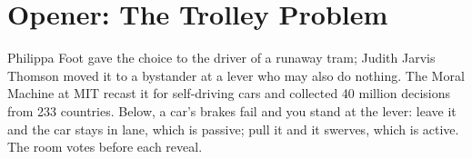 \newpage
\section*{Opener: The Trolley Problem}

 Philippa Foot gave the choice to the
driver of a runaway tram\cite{foot1967abortion}; Judith Jarvis Thomson
moved it to a bystander at a lever who may also do
nothing\cite{thomson1985trolley}. The Moral Machine
at MIT recast it for self-driving cars and collected 40 million decisions
from 233 countries\cite{awad2018moral}. Below, a car's brakes fail and you
stand at the lever: leave it and the car stays in lane, which is passive;
pull it and it swerves, which is active. The room votes before each reveal.

\newcommand{\mmdead}[2]{\foreach \x in {#2} \fill[mmdead] (\x,#1) circle (0.06);}
\newcommand{\mmalive}[2]{\foreach \x in {#2}
  \draw[mmalive, line width=0.5pt] (\x,#1) circle (0.055);}
\newcommand{\mmpanel}[3][false]{%
  \begin{tikzpicture}
    \path (0,-0.4) rectangle (4.95,1.45);
    \draw[black!20, line width=0.4pt] (0,0) -- (4.4,0) (0,1.2) -- (4.4,1.2);
    \draw[black!20, line width=0.4pt, dash pattern=on 3pt off 3pt]
      (0,0.6) -- (4.4,0.6);
    #3
    \fill[black!15, rounded corners=0.13cm] (0.15,0.77) rectangle (0.85,1.03);
    \ifthenelse{\equal{#1}{true}}{\mmdead{0.9}{0.62}}{\mmalive{0.9}{0.62}}
    \ifthenelse{\equal{#2}{pull}}
      {\draw[black!60, line width=0.5pt, -{Stealth[length=2.5pt]}]
         (0.95,0.9) .. controls (1.6,0.9) and (1.9,0.3) .. (2.7,0.3);}
      {\draw[black!60, line width=0.5pt, -{Stealth[length=2.5pt]}]
         (0.95,0.9) -- (2.7,0.9);}
    \node[font=\footnotesize] at (2.2,-0.25) {\textsc{#2}};
  \end{tikzpicture}}

